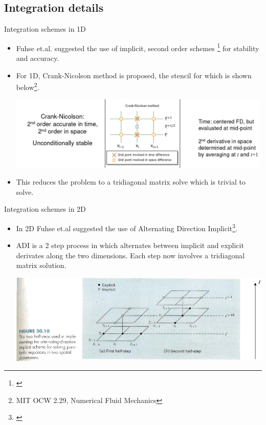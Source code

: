 \documentclass{beamer}
\begin{document}
\subsection{Integration details}
\begin{frame}{Integration schemes in 1D}
\begin{itemize}
	\item Fuhse et.al. suggested the use of implicit, second order schemes \footnote{\cite{Fuhse_thesis}} for stability and accuracy.
	\item For 1D, Crank-Nicolson method is proposed, the stencil for which is shown below\footnote{MIT OCW 2.29, Numerical Fluid Mechanics}.
	\begin{center}
		\includegraphics[scale=0.25]{cn}
	\end{center}
	\item This reduces the problem to a tridiagonal matrix solve which is trivial to solve. 
\end{itemize}
\end{frame}

\begin{frame}{Integration schemes in 2D}
\begin{itemize}
\item In 2D Fuhse et.al suggested the use of Alternating Direction Implicit\footnote{\cite{Fuhse_thesis}}. 
\item ADI is a 2 step process in which alternates between implicit and explicit derivates along the two dimensions. Each step now involves a tridiagonal matrix solution.
	\begin{center}
	\includegraphics[scale=0.25]{adi}
	\end{center}
\end{itemize}
\end{frame}
\end{document}
